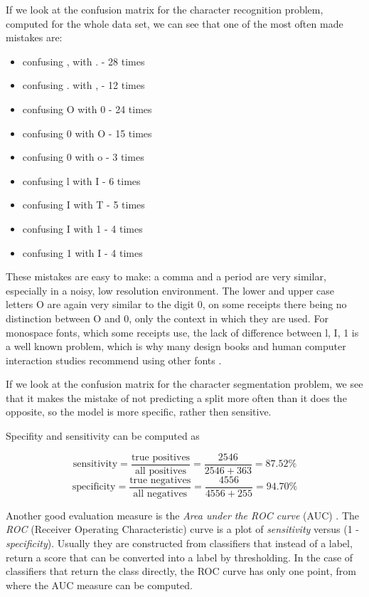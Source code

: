 If we look at the confusion matrix for the character recognition problem, computed for the whole data set, we can see that one of the most often made mistakes are:
\begin{itemize}
\item confusing , with . - 28 times
\item confusing . with , - 12 times
\item confusing O with 0 - 24 times
\item confusing 0 with O - 15 times
\item confusing 0 with o - 3 times
\item confusing l with I - 6 times
\item confusing I with T - 5 times
\item confusing I with 1 - 4 times
\item confusing 1 with I - 4 times
\end{itemize} 

These mistakes are easy to make: a comma and a period are very similar, especially in a noisy, low resolution environment. The lower and upper case letters O are again very similar to the digit 0, on some receipts there being no distinction between O and 0, only the context in which they are used. For monospace fonts, which some receipts use, the lack of difference between l, I, 1 is a well known problem, which is why many design books and human computer interaction studies recommend using other fonts \cite{chaparro2006examining}. 

If we look at the confusion matrix for the character segmentation problem, we see that it makes the mistake of not predicting a split more often than it does the opposite, so the model is more specific, rather then sensitive. 

Specifity and sensitivity can be computed as \cite{Fawcett_2006}

\[
    \text{sensitivity} = \frac{\text{true positives}}{\text{all positives}} = \frac{2546}{2546+363} = 87.52 \%
\]
\[
    \text{specificity} = \frac{\text{true negatives}}{\text{all negatives}} = \frac{4556}{4556+255} =  94.70 \%
\]

Another good evaluation measure is the \textit{Area under the ROC curve} (AUC) \cite{Fawcett_2006}. The \textit{ROC} (Receiver Operating Characteristic) curve is a plot of \textit{sensitivity} versus (1 - \textit{specificity}). Usually they are constructed from classifiers that instead of a label, return a score that can be converted into a label by thresholding. In the case of classifiers that return the class directly, the ROC curve has only one point, from where the AUC measure can be computed. 


